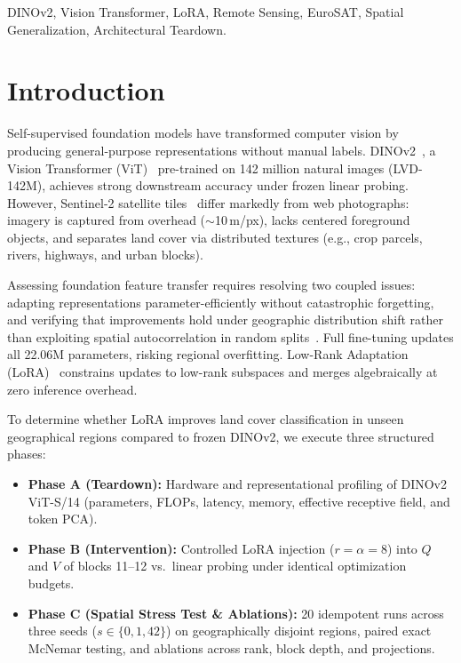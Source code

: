 \documentclass[conference]{IEEEtran}
\begin{document}
\begin{IEEEkeywords}
DINOv2, Vision Transformer, LoRA, Remote Sensing, EuroSAT, Spatial Generalization, Architectural Teardown.
\end{IEEEkeywords}

\section{Introduction}
Self-supervised foundation models have transformed computer vision by producing general-purpose representations without manual labels. DINOv2~\cite{oquab2024dinov2}, a Vision Transformer (ViT)~\cite{dosovitskiy2021image} pre-trained on 142 million natural images (LVD-142M), achieves strong downstream accuracy under frozen linear probing. However, Sentinel-2 satellite tiles~\cite{drusch2012sentinel} differ markedly from web photographs: imagery is captured from overhead ($\sim$10\,m/px), lacks centered foreground objects, and separates land cover via distributed textures (e.g., crop parcels, rivers, highways, and urban blocks).

Assessing foundation feature transfer requires resolving two coupled issues: adapting representations parameter-efficiently without catastrophic forgetting, and verifying that improvements hold under geographic distribution shift rather than exploiting spatial autocorrelation in random splits~\cite{roberts2017cross}. Full fine-tuning updates all 22.06M parameters, risking regional overfitting. Low-Rank Adaptation (LoRA)~\cite{hu2022lora} constrains updates to low-rank subspaces and merges algebraically at zero inference overhead.

To determine whether LoRA improves land cover classification in unseen geographical regions compared to frozen DINOv2, we execute three structured phases:
\begin{itemize}
    \item \textbf{Phase A (Teardown):} Hardware and representational profiling of DINOv2 ViT-S/14 (parameters, FLOPs, latency, memory, effective receptive field, and token PCA).
    \item \textbf{Phase B (Intervention):} Controlled LoRA injection ($r=\alpha=8$) into $Q$ and $V$ of blocks 11--12 vs.\ linear probing under identical optimization budgets.
    \item \textbf{Phase C (Spatial Stress Test \& Ablations):} 20 idempotent runs across three seeds ($s \in \{0, 1, 42\}$) on geographically disjoint regions, paired exact McNemar testing, and ablations across rank, block depth, and projections.
\end{itemize}
\end{document}
